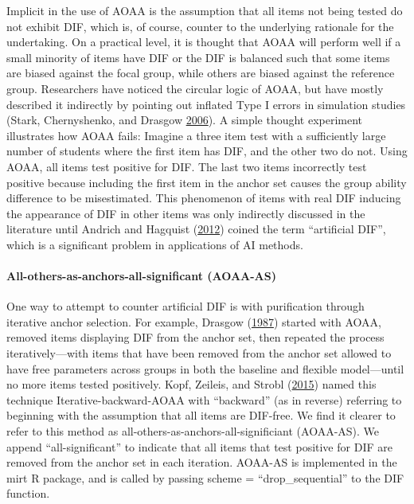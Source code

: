 \documentclass[
  11pt,
]{article}
\begin{document}
Implicit in the use of AOAA is the assumption that all items not being tested do not exhibit DIF, which is, of course, counter to the underlying rationale for the undertaking. On a practical level, it is thought that AOAA will perform well if a small minority of items have DIF or the DIF is balanced such that some items are biased against the focal group, while others are biased against the reference group. Researchers have noticed the circular logic of AOAA, but have mostly described it indirectly by pointing out inflated Type I errors in simulation studies (Stark, Chernyshenko, and Drasgow \protect\hyperlink{ref-stark2006detecting}{2006}). A simple thought experiment illustrates how AOAA fails: Imagine a three item test with a sufficiently large number of students where the first item has DIF, and the other two do not. Using AOAA, all items test positive for DIF. The last two items incorrectly test positive because including the first item in the anchor set causes the group ability difference to be misestimated. This phenomenon of items with real DIF inducing the appearance of DIF in other items was only indirectly discussed in the literature until Andrich and Hagquist (\protect\hyperlink{ref-andrich2012real}{2012}) coined the term \enquote{artificial DIF}, which is a significant problem in applications of AI methods.

\hypertarget{all-others-as-anchors-all-significant-aoaa-as}{%
\paragraph{All-others-as-anchors-all-significant (AOAA-AS)}\label{all-others-as-anchors-all-significant-aoaa-as}}

One way to attempt to counter artificial DIF is with purification through iterative anchor selection. For example, Drasgow (\protect\hyperlink{ref-drasgow1987study}{1987}) started with AOAA, removed items displaying DIF from the anchor set, then repeated the process iteratively---with items that have been removed from the anchor set allowed to have free parameters across groups in both the baseline and flexible model---until no more items tested positively. Kopf, Zeileis, and Strobl (\protect\hyperlink{ref-kopf2015framework}{2015}) named this technique Iterative-backward-AOAA with \enquote{backward} (as in reverse) referring to beginning with the assumption that all items are DIF-free. We find it clearer to refer to this method as all-others-as-anchors-all-significiant (AOAA-AS). We append \enquote{all-significant} to indicate that all items that test positive for DIF are removed from the anchor set in each iteration. AOAA-AS is implemented in the mirt R package, and is called by passing scheme = \enquote{drop\_sequential} to the DIF function.
\end{document}
